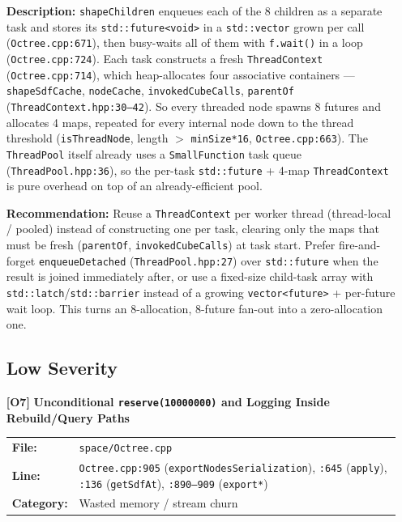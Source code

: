 \documentclass[a4paper,12pt]{article}
\newcommand{\severitybox}[2]{%
  \colorbox{#1}{\makebox[2.5cm][c]{\textcolor{white}{\textbf{#2}}}}%
}
\begin{document}
\begin{enumerate}[leftmargin=*]
  \textbf{Description:}
  \texttt{shapeChildren} enqueues each of the 8 children as a separate task and
  stores its \texttt{std::future<void>} in a \texttt{std::vector} grown per call
  (\texttt{Octree.cpp:671}), then busy-waits all of them with
  \texttt{f.wait()} in a loop (\texttt{Octree.cpp:724}). Each task constructs a
  fresh \texttt{ThreadContext} (\texttt{Octree.cpp:714}), which heap-allocates four
  associative containers — \texttt{shapeSdfCache}, \texttt{nodeCache},
  \texttt{invokedCubeCalls}, \texttt{parentOf} (\texttt{ThreadContext.hpp:30--42}).
  So every threaded node spawns 8 futures and allocates 4 maps, repeated for every
  internal node down to the thread threshold (\texttt{isThreadNode}, length
  $>$ \texttt{minSize*16}, \texttt{Octree.cpp:663}). The \texttt{ThreadPool} itself
  already uses a \texttt{SmallFunction} task queue (\texttt{ThreadPool.hpp:36}), so
  the per-task \texttt{std::future} + 4-map \texttt{ThreadContext} is pure overhead
  on top of an already-efficient pool.

  \textbf{Recommendation:}
  Reuse a \texttt{ThreadContext} per worker thread (thread-local / pooled) instead
  of constructing one per task, clearing only the maps that must be fresh
  (\texttt{parentOf}, \texttt{invokedCubeCalls}) at task start. Prefer
  fire-and-forget \texttt{enqueueDetached} (\texttt{ThreadPool.hpp:27}) over
  \texttt{std::future} when the result is joined immediately after, or use a
  fixed-size child-task array with \texttt{std::latch}/\texttt{std::barrier}
  instead of a growing \texttt{vector<future>} + per-future wait loop. This turns
  an 8-allocation, 8-future fan-out into a zero-allocation one.

\subsection{Low Severity}

\item[\textbf{[O7]}] \textbf{Unconditional \texttt{reserve(10000000)} and Logging Inside Rebuild/Query Paths}
  \hfill \severitybox{lowcolor}{LOW}

  \begin{tabular}{ll}
    \textbf{File:} & \texttt{space/Octree.cpp} \\
    \textbf{Line:} & \texttt{Octree.cpp:905} (\texttt{exportNodesSerialization}),
                      \texttt{:645} (\texttt{apply}), \texttt{:136} (\texttt{getSdfAt}),
                      \texttt{:890--909} (\texttt{export*}) \\
    \textbf{Category:} & Wasted memory / stream churn \\
  \end{tabular}


\end{enumerate}
\end{document}
